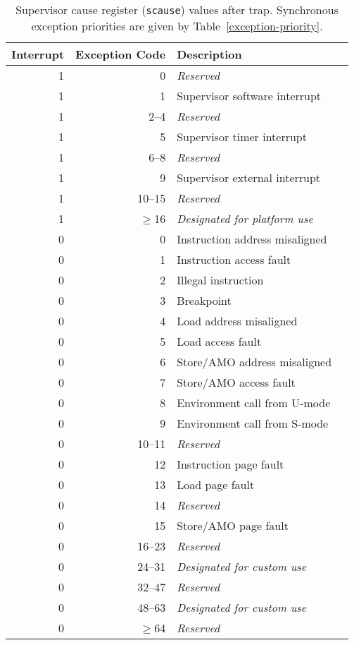 \begin{table*}[h!]
\begin{center}
\begin{tabular}{|r|r|l|l|}
  \hline
  Interrupt & Exception Code  & Description \\
  \hline
  1         & 0               & {\em Reserved} \\
  1         & 1               & Supervisor software interrupt \\
  1         & 2--4            & {\em Reserved} \\
  1         & 5               & Supervisor timer interrupt \\
  1         & 6--8            & {\em Reserved} \\
  1         & 9               & Supervisor external interrupt \\
  1         & 10--15          & {\em Reserved} \\
  1         & $\ge$16         & {\em Designated for platform use} \\ \hline
  0         & 0               & Instruction address misaligned \\
  0         & 1               & Instruction access fault \\
  0         & 2               & Illegal instruction \\
  0         & 3               & Breakpoint \\
  0         & 4               & Load address misaligned \\
  0         & 5               & Load access fault \\
  0         & 6               & Store/AMO address misaligned \\
  0         & 7               & Store/AMO access fault \\
  0         & 8               & Environment call from U-mode \\
  0         & 9               & Environment call from S-mode \\
  0         & 10--11          & {\em Reserved} \\
  0         & 12              & Instruction page fault \\
  0         & 13              & Load page fault \\
  0         & 14              & {\em Reserved} \\
  0         & 15              & Store/AMO page fault \\
  0         & 16--23          & {\em Reserved} \\
  0         & 24--31          & {\em Designated for custom use} \\
  0         & 32--47          & {\em Reserved} \\
  0         & 48--63          & {\em Designated for custom use} \\
  0         & $\ge$64         & {\em Reserved} \\
  \hline
\end{tabular}
\end{center}
\caption{Supervisor cause register ({\tt scause}) values after trap.
Synchronous exception priorities are given by Table~\ref{exception-priority}.}
\label{scauses}
\end{table*}

